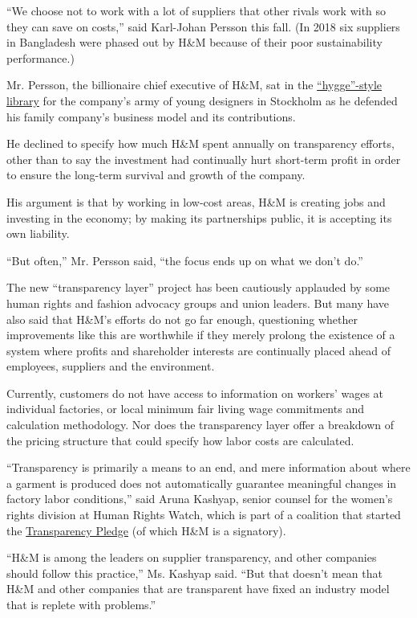 ``We choose not to work with a lot of suppliers that other rivals work
with so they can save on costs,'' said Karl-Johan Persson this fall. (In
2018 six suppliers in Bangladesh were phased out by H\&M because of
their poor sustainability performance.)

Mr. Persson, the billionaire chief executive of H\&M, sat in the
\href{https://www.nytimes.com/2016/12/24/fashion/wintering-the-danish-way-learning-about-hygge.html}{``hygge''-style
library} for the company's army of young designers in Stockholm as he
defended his family company's business model and its contributions.

He declined to specify how much H\&M spent annually on transparency
efforts, other than to say the investment had continually hurt
short-term profit in order to ensure the long-term survival and growth
of the company.

His argument is that by working in low-cost areas, H\&M is creating jobs
and investing in the economy; by making its partnerships public, it is
accepting its own liability.

``But often,'' Mr. Persson said, ``the focus ends up on what we don't
do.''

The new ``transparency layer'' project has been cautiously applauded by
some human rights and fashion advocacy groups and union leaders. But
many have also said that H\&M's efforts do not go far enough,
questioning whether improvements like this are worthwhile if they merely
prolong the existence of a system where profits and shareholder
interests are continually placed ahead of employees, suppliers and the
environment.

Currently, customers do not have access to information on workers' wages
at individual factories, or local minimum fair living wage commitments
and calculation methodology. Nor does the transparency layer offer a
breakdown of the pricing structure that could specify how labor costs
are calculated.

``Transparency is primarily a means to an end, and mere information
about where a garment is produced does not automatically guarantee
meaningful changes in factory labor conditions,'' said Aruna Kashyap,
senior counsel for the women's rights division at Human Rights Watch,
which is part of a coalition that started the
\href{https://www.hrw.org/news/2017/04/20/more-brands-should-reveal-where-their-clothes-are-made}{Transparency
Pledge} (of which H\&M is a signatory).

``H\&M is among the leaders on supplier transparency, and other
companies should follow this practice,'' Ms. Kashyap said. ``But that
doesn't mean that H\&M and other companies that are transparent have
fixed an industry model that is replete with problems.''


